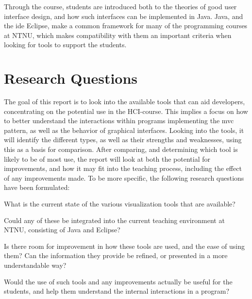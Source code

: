 Through the course, students are introduced both to the theories of good user interface design, and how such interfaces can be implemented in Java.
Java, and the \gls{ide} Eclipse, make a common framework for many of the programming courses at NTNU, which makes compatibility with them an important criteria when looking for tools to support the students.

\section{Research Questions}\label{intro-RQs}

The goal of this report is to look into the available tools that can aid developers, concentrating on the potential use in the HCI-course.
This implies a focus on how to better understand the interactions within programs implementing the \gls{mvc} pattern, as well as the behavior of graphical interfaces.
Looking into the tools, it will identify the different types, as well as their strengths and weaknesses, using this as a basis for comparison.
After comparing, and determining which tool is likely to be of most use, the report will look at both the potential for improvements, and how it may fit into the teaching process, including the effect of any improvements made.
To be more specific, the following research questions have been formulated:
\begin{theorem}
What is the current state of the various visualization tools that are available?
\end{theorem}
\begin{theorem}
Could any of these be integrated into the current teaching environment at NTNU, consisting of Java and Eclipse? %
\end{theorem}
\begin{theorem}
Is there room for improvement in how these tools are used, and the ease of using them? Can the information they provide be refined, or presented in a more understandable way? %
\end{theorem}
\begin{theorem}
Would the use of such tools and any improvements actually be useful for the students, and help them understand the internal interactions in a program?%
\end{theorem}
